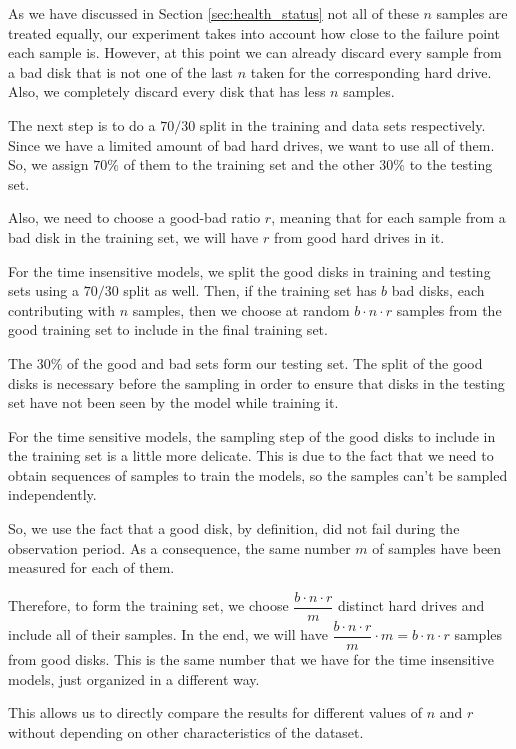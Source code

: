 As we have discussed in Section \ref{sec:health_status} not all of these $n$ samples are treated equally, our experiment takes into account how close to the failure point each sample is.
However, at this point we can already discard every sample from a bad disk that is not one of the last $n$ taken for the corresponding hard drive.
Also, we completely discard every disk that has less $n$ samples.

The next step is to do a $70/30$ split in the training and data sets respectively.
Since we have a limited amount of bad hard drives, we want to use all of them.
So, we assign $70\%$ of them to the training set and the other $30\%$ to the testing set.

Also, we need to choose a good-bad ratio $r$, meaning that for each sample from a bad disk in the training set, we will have $r$ from good hard drives in it.

For the time insensitive models, we split the good disks in training and testing sets using a $70/30$ split as well.
Then, if the training set has $b$ bad disks, each contributing with $n$ samples, then we choose at random $b\cdot n \cdot r$ samples from the good training set to include in the final training set.

The $30\%$ of the good and bad sets form our testing set.
The split of the good disks is necessary before the sampling in order to ensure that disks in the testing set have not been seen by the model while training it.

For the time sensitive models, the sampling step of the good disks to include in the training set is a little more delicate.
This is due to the fact that we need to obtain sequences of samples to train the models, so the samples can't be sampled independently.

So, we use the fact that a good disk, by definition, did not fail during the observation period.
As a consequence, the same number $m$ of samples have been measured for each of them.

Therefore, to form the training set, we choose $\dfrac{b\cdot n \cdot r}{m}$ distinct hard drives and include all of their samples.
In the end, we will have $\dfrac{b\cdot n \cdot r}{m} \cdot m = b\cdot n \cdot r$ samples from good disks.
This is the same number that we have for the time insensitive models, just organized in a different way.

This allows us to directly compare the results for different values of $n$ and $r$ without depending on other characteristics of the dataset.

